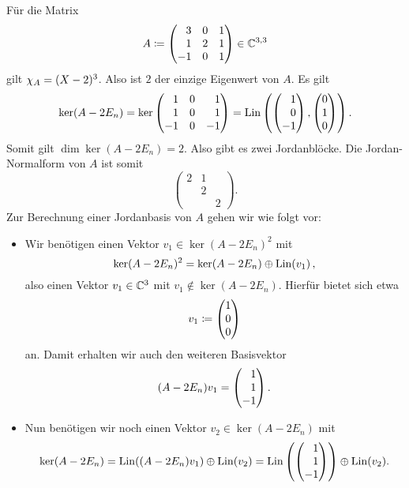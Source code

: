 \documentclass[a4paper,10pt,numbers = noenddot]{scrartcl}
\begin{document}
\begin{example}
  Für die Matrix
  \[
              A
    \defined \begin{pmatrix*}[r]
                 3  & 0 & 1 \\
                 1  & 2 & 1 \\
                -1  & 0 & 1
              \end{pmatrix*}
    \in \matrices{3}{\Complex}
  \]
  gilt $\chi_{A} = (X-2)^3$.
  Also ist $2$ der einzige Eigenwert von $A$.
  Es gilt
  \[
      \ker (A - 2E_n)
    = \ker
      \begin{pmatrix*}[r]
         1  & 0 &  1  \\
         1  & 0 &  1  \\
        -1  & 0 & -1
      \end{pmatrix*}
    = \Lin\left( \columnrvector{1 \\ 0 \\ -1}, \columnvector{0 \\ 1 \\ 0} \right).
  \]
  Somit gilt $\dim \ker (A - 2E_n) = 2$.
  Also gibt es zwei Jordanblöcke.
  Die Jor\-dan-Nor\-mal\-form von $A$ ist somit
  \[
    \begin{pmatrix}
      2 & 1 &   \\
        & 2 &   \\
        &   & 2
    \end{pmatrix}.
  \]
  Zur Berechnung einer Jordanbasis von $A$ gehen wir wie folgt vor:
  \begin{itemize}
    \item
      Wir benötigen einen Vektor $v_1 \in \ker (A - 2 E_n)^2$ mit
      \[
          \ker (A - 2 E_n)^2
        = \ker (A - 2 E_n) \oplus \operatorname{Lin}(v_1) \,,
      \]
      also einen Vektor $v_1 \in \mathbb{C}^3$ mit $v_1 \notin \ker (A - 2 E_n)$.
      Hierfür bietet sich etwa
      \[
                  v_1
        \coloneqq \begin{pmatrix} 1 \\ 0 \\ 0 \end{pmatrix}
      \]
      an.
      Damit erhalten wir auch den weiteren Basisvektor
      \[
          (A - 2 E_n) v_1
        = \columnrvector{1 \\ 1 \\ -1}.
      \]
    \item
      Nun benötigen wir noch einen Vektor $v_2 \in \ker (A - 2 E_n)$ mit
      \[
          \ker (A - 2 E_n)
        = \Lin( (A - 2 E_n) v_1 ) \oplus \Lin(v_2)
        = \Lin\left( \columnrvector{1 \\ 1 \\ -1} \right) \oplus \Lin(v_2).
\]
\end{itemize}
\end{example}
\end{document}
